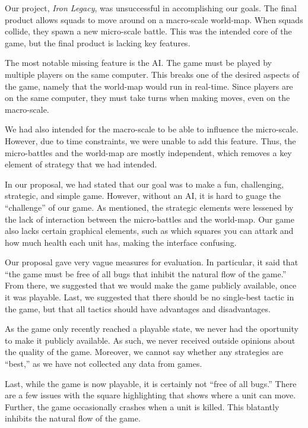 \documentclass{article}
\begin{document}
Our project, \emph{Iron Legacy}, was unsuccessful in accomplishing
    our goals.
    The final product allows squads to move around on a macro-scale world-map.
    When squads collide, they spawn a new micro-scale battle.
    This was the intended core of the game, but the final product is lacking
    key features.

The most notable missing feature is the AI.
    The game must be played by multiple players on the same computer.
    This breaks one of the desired aspects of the game,
    namely that the world-map would run in real-time.
    Since players are on the same computer, they must take turns when making
    moves, even on the macro-scale.

We had also intended for the macro-scale to be able to influence the
    micro-scale.
    However, due to time constraints, we were unable to add this feature.
    Thus, the micro-battles and the world-map are mostly independent,
    which removes a key element of strategy that we had intended.

In our proposal, we had stated that our goal was to make a fun, challenging,
    strategic, and simple game.
    However, without an AI, it is hard to guage the ``challenge'' of our game.
    As mentioned, the strategic elements were lessened by the lack of
    interaction between the micro-battles and the world-map.
    Our game also lacks certain graphical elements, such as which squares
    you can attark and how much health each unit has, making the interface
    confusing.

Our proposal gave very vague measures for evaluation.
    In particular, it said that ``the game must be free of all bugs that
    inhibit the natural flow of the game.''
    From there, we suggested that we would make the game publicly available,
    once it was playable.
    Last, we suggested that there should be no single-best tactic in the game,
    but that all tactics should have advantages and disadvantages.

As the game only recently reached a playable state,
    we never had the oportunity to make it publicly available.
    As such, we never received outside opinions about the quality of the game.
    Moreover, we cannot say whether any strategies are ``best,''
    as we have not collected any data from games.

Last, while the game is now playable, it is certainly not ``free of all bugs.''
    There are a few issues with the square highlighting that shows
    where a unit can move.
    Further, the game occasionally crashes when a unit is killed.
    This blatantly inhibits the natural flow of the game.
\end{document}
